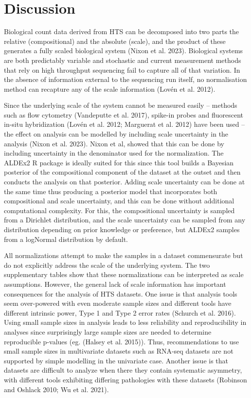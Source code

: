 \documentclass[
]{article}
\begin{document}
\hypertarget{discussion}{%
\section{Discussion}\label{discussion}}

Biological count data derived from HTS can be decomposed into two parts
the relative (compositional) and the absolute (scale), and the product
of these generates a fully scaled biological system (Nixon et al. 2023).
Biological systems are both predictably variable and stochastic and
current measurement methods that rely on high throughput sequencing fail
to capture all of that variation. In the absence of information external
to the sequencing run itself, no normalisation method can recapture any
of the scale information (Lovén et al. 2012).

Since the underlying scale of the system cannot be measured easily --
methods such as flow cytometry (Vandeputte et al. 2017), spike-in probes
and fluorescent in-situ hybridization (Lovén et al. 2012; Marguerat et
al. 2012) have been used -- the effect on analysis can be modelled by
including scale uncertainty in the analysis (Nixon et al. 2023). Nixon
et al, showed that this can be done by including uncertainty in the
denominator used for the normalization. The ALDEx2 R package is ideally
suited for this since this tool builds a Bayesian posterior of the
compositional component of the dataset at the outset and then conducts
the analysis on that posterior. Adding scale uncertainty can be done at
the same time thus producing a posterior model that incorporates both
compositional and scale uncertainty, and this can be done without
additional computational complexity. For this, the compositional
uncertainty is sampled from a Dirichlet distribution, and the scale
uncertainty can be sampled from any distribution depending on prior
knowledge or preference, but ALDEx2 samples from a logNormal
distribution by default.

All normalizations attempt to make the samples in a dataset commensurate
but do not explicitly address the scale of the underlying system. The
two supplementary tables show that these normalizations can be
interpreted as scale assumptions. However, the general lack of scale
information has important consequences for the analysis of HTS datasets.
One issue is that analysis tools seem over-powered with even moderate
sample sizes and different tools have different intrinsic power, Type 1
and Type 2 error rates (Schurch et al. 2016). Using small sample sizes
in analysis leads to less reliability and reproducibility in analyses
since surprisingly large sample sizes are needed to determine
reproducible p-values (eg. (Halsey et al. 2015)). Thus, recommendations
to use small sample sizes in multivariate datasets such as RNA-seq
datasets are not supported by simple modelling in the univariate case.
Another issue is that datasets are difficult to analyze when there they
contain systematic asymmetry, with different tools exhibiting differing
pathologies with these datasets (Robinson and Oshlack 2010; Wu et al.
2021).
\end{document}
